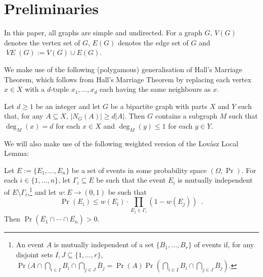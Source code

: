 \documentclass{patmorin}
\DeclareMathOperator{\VE}{\mathit{VE}}
\begin{document}
\section{Preliminaries}


In this paper, all graphs are simple and undirected. For a graph $G$, $V(G)$ denotes the vertex set of $G$, $E(G)$ denotes the edge set of $G$ and $\VE(G):=V(G)\cup E(G)$.

We make use of the following (polygamous) generalisation of Hall's Marriage Theorem, which follows from Hall's Marriage Theorem by replacing each vertex $x\in X$ with a $d$-tuple $x_1,\ldots,x_d$ each having the same neighbours as $x$.

\begin{cor}\label{d_hall}
  Let $d\ge 1$ be an integer and let $G$ be a bipartite graph with parts $X$ and $Y$ such that, for any $A\subseteq X$, $|N_G(A)|\ge d|A|$.  Then $G$ contains a subgraph $M$ such that $\deg_M(x)=d$ for each $x\in X$ and $\deg_M(y)\le 1$ for each $y\in Y$.
\end{cor}

We will also make use of the following weighted version of the Lovász Local Lemma:

\begin{lem}\label{weighted_lovasz}
  Let $E:=\{E_1,\ldots,E_n\}$ be a set of events in some probability space $(\Omega,\Pr)$.  For each $i\in\{1,\ldots,n\}$, let $\Gamma_i\subseteq E$ be such that the event $E_i$ is mutually independent of $E\setminus \Gamma_i$,\footnote{An event $A$ is mutually independent of a set $\{B_1,\ldots,B_r\}$ of events if, for any disjoint sets $I,J\subseteq\{1,\ldots,r\}$, $\Pr(A\cap\bigcap_{i\in I} B_i\cap\bigcap_{j\in J} \overline{B}_j=\Pr(A)\Pr(\bigcap_{i\in I} B_i\cap\bigcap_{j\in J} \overline{B}_j)$.} and let $w:E\to(0,1)$ be such that
  \[
      \Pr(E_i) \le w(E_i)\cdot\prod_{E_j\in\Gamma_i}(1-w(E_j))  \enspace .
  \]
  Then $\Pr(\overline{E_1}\cap\cdots\cap\overline{E_n}) > 0$.
\end{lem}
\end{document}
